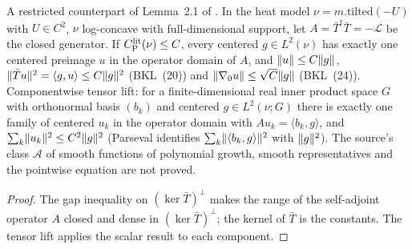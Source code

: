 \begin{lemma}
  \label{lem:bkl-centered-inverse}
  \leanok
  A restricted counterpart of Lemma~2.1 of \cite{BizeulKlartagLehec2026}.  In the heat model
  $\nu=m.\mathrm{tilted}(-U)$ with $U\in C^2$, $\nu$ log-concave with full-dimensional support, let
  $A=\bar T^\dagger\bar T=-\mathcal L$ be the closed generator.  If $C_{\mathrm P}^{\mathrm{lit}}(\nu)\le C$, every
  centered $g\in L^2(\nu)$ has exactly one centered preimage $u$ in the operator domain of $A$, and
  $\lVert u\rVert\le C\lVert g\rVert$, $\lVert\bar Tu\rVert^2=\langle g,u\rangle\le C\lVert g\rVert^2$ (BKL~(20)) and
  $\lVert\nabla_0u\rVert\le\sqrt C\lVert g\rVert$ (BKL~(24)).  Componentwise tensor lift: for a finite-dimensional
  real inner product space $G$ with orthonormal basis $(b_k)$ and centered $g\in L^2(\nu;G)$ there is
  exactly one family of centered $u_k$ in the operator domain with $Au_k=\langle b_k,g\rangle$, and
  $\sum_k\lVert u_k\rVert^2\le C^2\lVert g\rVert^2$ (Parseval identifies $\sum_k\lVert\langle b_k,g\rangle\rVert^2$ with
  $\lVert g\rVert^2$).  The source's class $\mathcal A$ of smooth functions of polynomial growth, smooth
  representatives and the pointwise equation are not proved.
\end{lemma}
\begin{proof}
  \leanok
  The gap inequality on $(\ker\bar T)^\perp$ makes the range of the self-adjoint operator $A$
  closed and dense in $(\ker\bar T)^\perp$; the kernel of $\bar T$ is the constants.  The tensor lift
  applies the scalar result to each component.
\end{proof}

